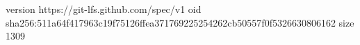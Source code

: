 version https://git-lfs.github.com/spec/v1
oid sha256:511a64f417963c19f75126ffea371769225254262cb50557f0f5326630806162
size 1309
